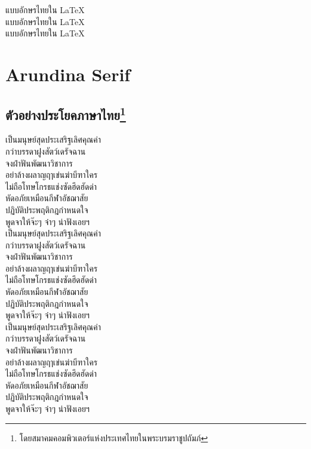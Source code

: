 \documentclass[twocolumn,a4paper]{article}
\begin{document}
\pagestyle{empty}
\vfil
\begin{figure*}
\Huge 
\hspace*{.3\textwidth}แบบอักษรไทยใน {\latintext\LaTeX}\\
\hspace*{.3\textwidth}แบบอักษรไทยใน {\latintext\LaTeX}\\
\hspace*{.3\textwidth}แบบอักษรไทยใน {\latintext\LaTeX}\\
\end{figure*}
\vfil
\clearpage

\pagestyle{plain}
\section{Arundina Serif}
\subsection{ตัวอย่างประโยคภาษาไทย\protect\footnote{โดยสมาคมคอมพิวเตอร์แห่งประเทศไทยในพระบรมราชูปถัมภ์}}

เป็นมนุษย์สุดประเสริฐเลิศคุณค่า\\
กว่าบรรดาฝูงสัตว์เดรัจฉาน \\
จงฝ่าฟันพัฒนาวิชาการ \\
อย่าล้างผลาญฤๅเข่นฆ่าบีฑาใคร\\ 
ไม่ถือโทษโกรธแช่งซัดฮึดฮัดด่า \\
หัดอภัยเหมือนกีฬาอัชฌาสัย \\
ปฏิบัติประพฤติกฎกำหนดใจ \\
พูดจาให้จ๊ะๆ จ๋าๆ น่าฟังเอยฯ\\ 

เป็นมนุษย์สุดประเสริฐเลิศคุณค่า\\
กว่าบรรดาฝูงสัตว์เดรัจฉาน \\
จงฝ่าฟันพัฒนาวิชาการ \\
อย่าล้างผลาญฤๅเข่นฆ่าบีฑาใคร\\ 
ไม่ถือโทษโกรธแช่งซัดฮึดฮัดด่า \\
หัดอภัยเหมือนกีฬาอัชฌาสัย \\
ปฏิบัติประพฤติกฎกำหนดใจ \\
พูดจาให้จ๊ะๆ จ๋าๆ น่าฟังเอยฯ\\ 

เป็นมนุษย์สุดประเสริฐเลิศคุณค่า\\
กว่าบรรดาฝูงสัตว์เดรัจฉาน \\
จงฝ่าฟันพัฒนาวิชาการ \\
อย่าล้างผลาญฤๅเข่นฆ่าบีฑาใคร\\ 
ไม่ถือโทษโกรธแช่งซัดฮึดฮัดด่า \\
หัดอภัยเหมือนกีฬาอัชฌาสัย \\
ปฏิบัติประพฤติกฎกำหนดใจ \\
พูดจาให้จ๊ะๆ จ๋าๆ น่าฟังเอยฯ\\ 
\end{document}
